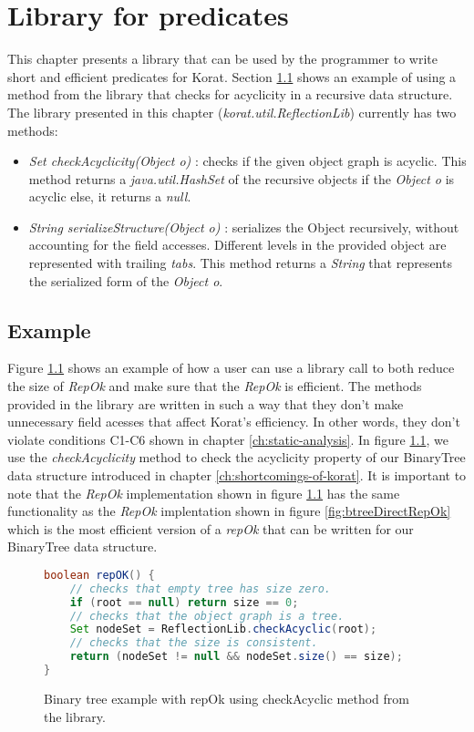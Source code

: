 \chapter{Library for predicates}
\label{ch:library-for-predicates}
This chapter presents a library that can be used by the programmer
to write short and efficient predicates for Korat. Section
\ref{sec:library-for-predicates-example} shows an example of using a
method from the library that checks for acyclicity in a recursive data
structure. The library presented in this chapter
(\emph{korat.util.ReflectionLib}) currently has two methods:
\begin{itemize}
\item \emph{Set checkAcyclicity(Object o)} : checks if the given
  object graph is acyclic. This method returns a
  \emph{java.util.HashSet} of the recursive objects if the
  \emph{Object o} is acyclic else, it returns a \emph{null}.
\item \emph{String serializeStructure(Object o)} : serializes the
  Object recursively, without accounting for the field
  accesses. Different levels in the provided object are represented
  with trailing \emph{tabs}. This method returns a \emph{String} that
  represents the serialized form of the \emph{Object o}.
\end{itemize}

\section{Example}
\label{sec:library-for-predicates-example}
Figure \ref{fig:btreeLibraryRepOk} shows an example of how a user can
use a library call to both reduce the size of \emph{RepOk} and make
sure that the \emph{RepOk} is efficient. The methods provided in the
library are written in such a way that they don't make unnecessary
field acesses that affect Korat's efficiency. In other words, they
don't violate conditions C1-C6 shown in chapter
\ref{ch:static-analysis}. In figure \ref{fig:btreeLibraryRepOk}, we
use the \emph{checkAcyclicity} method to check the acyclicity property
of our BinaryTree data structure introduced in chapter
\ref{ch:shortcomings-of-korat}. It is important to note that the
\emph{RepOk} implementation shown in figure
\ref{fig:btreeLibraryRepOk} has the same functionality as the
\emph{RepOk} implentation shown in figure \ref{fig:btreeDirectRepOk}
which is the most efficient version of a \emph{repOk} that can be
written for our BinaryTree data structure.

\begin{figure}
\centering
\begin{lstlisting}[language=Java]
boolean repOK() {
    // checks that empty tree has size zero.
    if (root == null) return size == 0;
    // checks that the object graph is a tree.
    Set nodeSet = ReflectionLib.checkAcyclic(root);
    // checks that the size is consistent.
    return (nodeSet != null && nodeSet.size() == size);
}
\end{lstlisting}
\caption{Binary tree example with repOk using checkAcyclic method from the library.}
\label{fig:btreeLibraryRepOk}
\end{figure}
